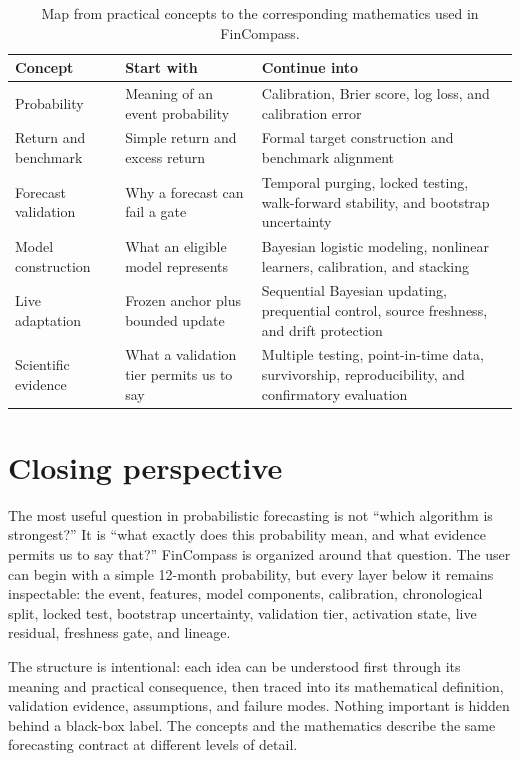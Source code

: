\documentclass[11pt]{article}
\begin{document}
\begin{table}[tbp]
\centering
\small
\caption{Map from practical concepts to the corresponding mathematics used in FinCompass.}
\begin{tabularx}{\textwidth}{@{}p{}p{}X@{}}
\toprule
Concept & Start with & Continue into \\
\midrule
Probability & Meaning of an event probability & Calibration, Brier score, log loss, and calibration error \\
Return and benchmark & Simple return and excess return & Formal target construction and benchmark alignment \\
Forecast validation & Why a forecast can fail a gate & Temporal purging, locked testing, walk-forward stability, and bootstrap uncertainty \\
Model construction & What an eligible model represents & Bayesian logistic modeling, nonlinear learners, calibration, and stacking \\
Live adaptation & Frozen anchor plus bounded update & Sequential Bayesian updating, prequential control, source freshness, and drift protection \\
Scientific evidence & What a validation tier permits us to say & Multiple testing, point-in-time data, survivorship, reproducibility, and confirmatory evaluation \\
\bottomrule
\end{tabularx}
\end{table}

\section{Closing perspective}

The most useful question in probabilistic forecasting is not ``which algorithm is strongest?'' It is ``what exactly does this probability mean, and what evidence permits us to say that?'' FinCompass is organized around that question. The user can begin with a simple 12-month probability, but every layer below it remains inspectable: the event, features, model components, calibration, chronological split, locked test, bootstrap uncertainty, validation tier, activation state, live residual, freshness gate, and lineage.

The structure is intentional: each idea can be understood first through its meaning and practical consequence, then traced into its mathematical definition, validation evidence, assumptions, and failure modes. Nothing important is hidden behind a black-box label. The concepts and the mathematics describe the same forecasting contract at different levels of detail.
\end{document}
